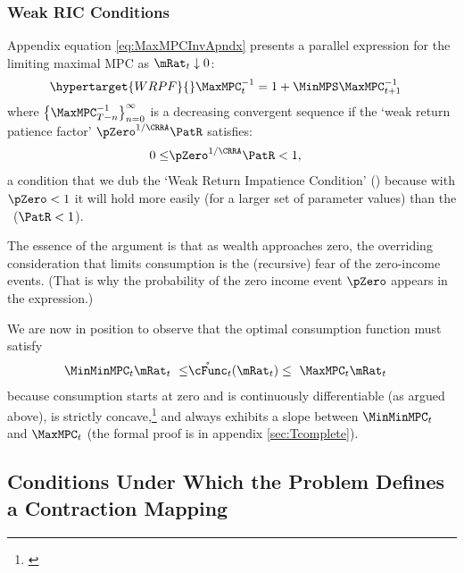 \documentclass[BufferStockTheory]{subfiles}
\begin{document}
\subsubsection{Weak RIC Conditions}{}\label{sec:WRIC}
\hypertarget{MPCnvrsUpper}{}
\hypertarget{WRIC}{}
Appendix equation \eqref{eq:MaxMPCInvApndx} presents a parallel expression for the limiting maximal MPC as $\mRat_{t} \downarrow 0$:
\begin{align}\hypertarget{WRPF}{}  
  \MaxMPC_{t}^{-1}  & = 1+\MinMPS \MaxMPC_{t+1}^{-1} \label{eq:MaxMPCInv}
\end{align}
where $\left\{\MaxMPC_{T-n}^{-1}\right\} _{n=0}^{\infty}$ is a decreasing %
convergent sequence if the `weak return patience factor' $\pZero^{1/\CRRA}\PatR$ satisfies:
\begin{align}
  0 \leq & \pZero^{1/\CRRA} \PatR < 1 \label{eq:WRIC},
\end{align}
a condition that we dub the `Weak Return Impatience Condition' (\WRIC)
because with $\pZero < 1$ it will hold more easily (for a larger set of parameter
values) than the \RIC~($\PatR < 1$).

The essence of the argument is that as wealth approaches zero, the overriding
consideration that limits consumption is the (recursive) fear of the zero-income events.  (That is why the probability of the zero
income event $\pZero$ appears in the expression.)  

\hypertarget{cBounds}{}
We are now in position to observe that the optimal consumption function must satisfy
\begin{align}
  \MinMinMPC_{t} \mRat_{t} ~ \leq &   \mathring{\cFunc}_{t}(\mRat_{t})  \leq  ~ \MaxMPC_{t} \mRat_{t} \label{eq:cBounds}
\end{align}
because consumption starts at zero and is continuously differentiable (as argued above), is strictly concave,\footnote{\cite{ckConcavity}} and always exhibits a slope between $\MinMinMPC_{t}$ and $\MaxMPC_{t}$ (the formal proof is in appendix \ref{sec:Tcomplete}).


\begin{comment}
  If the \FHWC~does not hold, we make do with a less useful bound on the minimal MPC: It is
  weakly greater than zero, which follows from the logic in
  \ref{sec:cExists}; hence the `max' in \eqref{eq:MinMinMPCDef}.
\end{comment}

\hypertarget{Conditions-Under-Which-the-Problem-Defines-a-Contraction-Mapping}{}
\subsection{Conditions Under Which the Problem Defines a Contraction Mapping}
\end{document}
